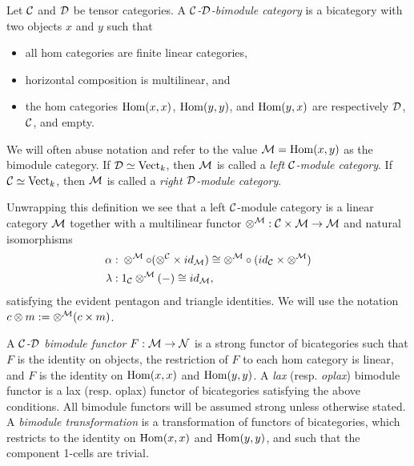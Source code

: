 \documentclass{amsart}
\begin{document}
\begin{definition}
	Let $\mathcal C$ and $\mathcal D$ be tensor categories. A {\em $\mathcal C$-$\mathcal D$-bimodule category} is a bicategory with two objects $x$ and $y$ such that
	\begin{itemize}
		\item all hom categories are finite linear categories, 
		\item horizontal composition is multilinear, and
		\item the hom categories $\operatorname{Hom}(x,x)$, $\operatorname{Hom}(y,y)$, and $\operatorname{Hom}(y,x)$ are respectively $\mathcal D$, $\mathcal C$, and empty.
	\end{itemize}
	We will often abuse notation and refer to the value $\mathcal M = \operatorname{Hom}(x,y)$ as the bimodule category. If $\mathcal D \simeq \mathrm{Vect}_k$, then $\mathcal M$ is called a {\em left $\mathcal C$-module category}. If $\mathcal C \simeq \mathrm{Vect}_k$, then $\mathcal M$ is called a {\em right $\mathcal D$-module category}.
\end{definition}
	
Unwrapping this definition we see that a left $\mathcal C$-module category is a linear category $\mathcal M$ together with a multilinear functor $\otimes^{\mathcal M}: \mathcal C \times \mathcal M \to \mathcal M$ and natural isomorphisms
	\begin{align*}
		\alpha: & \;    \otimes^{\mathcal M} \circ (\otimes^{\mathcal C} \times id_{\mathcal M}) \cong  \otimes^{\mathcal M} \circ (id_{\mathcal C} \times \otimes^{\mathcal M}) \\
		\lambda: & \; 1_{\mathcal C} \otimes^{\mathcal M}(-) \cong id_{\mathcal M},
	\end{align*}
	satisfying the evident pentagon and triangle identities.  We will use the notation $c \otimes m := \otimes^\mathcal M(c \times m)$.

\begin{definition}		
A {\em $\mathcal C$-$\mathcal D$ bimodule functor} $F:\mathcal M \to \mathcal N$ is a strong functor of bicategories such that 
		 $F$ is the identity on objects,
		  the restriction of $F$ to each hom category is linear,
		 and $F$ is the identity on $\operatorname{Hom}(x,x)$ and $\operatorname{Hom}(y,y)$.
A {\em lax} (resp. {\em oplax}) bimodule functor is a lax (resp. oplax) functor of bicategories satisfying the above conditions. All bimodule functors will be assumed strong unless otherwise stated. 
	A {\em bimodule transformation} is a transformation of functors of bicategories, which restricts to the identity on $\operatorname{Hom}(x,x)$ and $\operatorname{Hom}(y,y)$, and such that the component 1-cells are trivial.  
\end{definition} %
	
\end{document}
